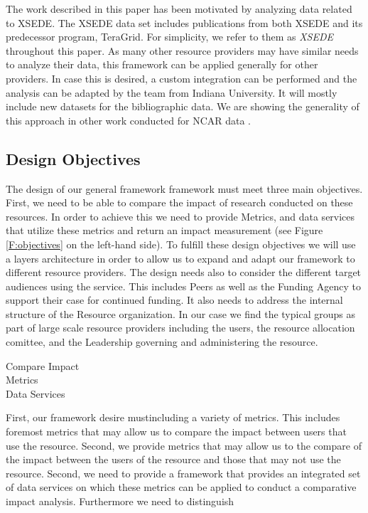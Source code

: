 \documentclass{sig-alternate}
\begin{document}
The work described in this paper has been motivated by analyzing data related to XSEDE. The XSEDE data set includes publications from both XSEDE and its predecessor program, TeraGrid. For simplicity, we refer to them as {\em XSEDE} throughout this paper. As many other resource providers may have similar needs to analyze their data, this framework can be applied generally for other  providers. In case this is desired, a custom integration can be performed and the analysis can be adapted by the team from Indiana University. It will mostly include new datasets for the bibliographic data. We are showing the generality of this approach in other work conducted for NCAR data \cite{?las15cluster}.


\subsection{Design Objectives}

The design of our general framework framework must meet three main objectives.  First, we need to be able to compare the impact of research conducted on these resources. In order to achieve this we need to provide Metrics, and data services that utilize these metrics and return an impact measurement (see Figure \ref{F:objectives} on the left-hand side). To fulfill these design objectives we will use a layers architecture in order to allow us to expand and adapt our framework to different resource providers. The design needs also to consider the different target audiences using the service. This includes Peers as well as the Funding Agency to support their case for continued funding. It also needs to address the internal structure of the Resource organization. In our case we find the typical groups as part of large scale resource providers including the users, the resource allocation comittee, and the Leadership governing and administering the resource.



\begin{description}

\item[Compare Impact]

\item[Metrics]

\item[Data Services]

\end{description}

First, our framework desire mustincluding a variety of metrics. This includes foremost metrics that may  allow us to compare the impact between users that use the resource.
Second, we provide metrics that may  allow us  to the compare of the impact between the users of the resource and those that may not use the resource. Second, we need to provide a framework that provides an integrated set of data services on which these metrics can be applied to conduct a comparative impact analysis.  Furthermore we need to distinguish 
\end{document}
